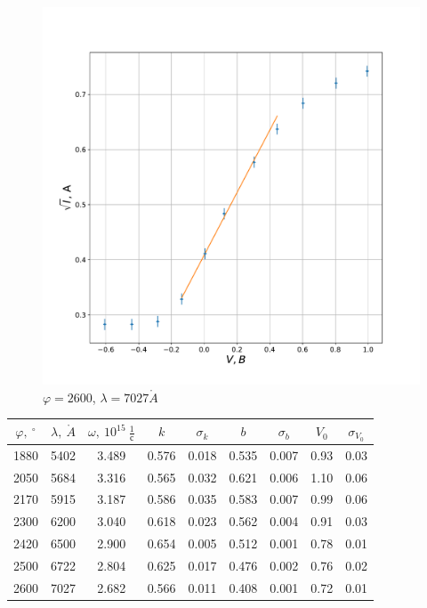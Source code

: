 \documentclass[a4paper, 12pt]{article}
\renewcommand{\phi}{\varphi}
\renewcommand{\AA}{\ensuremath{\mathring{A}}}
\begin{document}
\begin{figure}[H]
    \centering
    \includegraphics[scale=0.5]{2600}
    \caption {$\phi = 2600$, $\lambda = 7027 \AA$}
\end{figure}

\begin{table}[H]
    \centering
    \begin{tabular}{|c|c|c|c|c|c|c|c|c|}
        \hline
        $\phi, ~^\circ$ & $\lambda, ~\AA$ & $\omega, ~10^{15}~\frac{1}{с}$ & $k$ & $\sigma_k$ & $b$ & $\sigma_b$ & $V_0$ & $\sigma_{V_0}$ \\ \hline
        1880 & 5402 & 3.489 & 0.576 & 0.018 & 0.535 & 0.007 & 0.93 & 0.03\\ \hline
        2050 & 5684 & 3.316 & 0.565 & 0.032 & 0.621 & 0.006 & 1.10 & 0.06\\ \hline
        2170 & 5915 & 3.187 & 0.586 & 0.035 & 0.583 & 0.007 & 0.99 & 0.06\\ \hline
        2300 & 6200 & 3.040 & 0.618 & 0.023 & 0.562 & 0.004 & 0.91 & 0.03\\ \hline
        2420 & 6500 & 2.900 & 0.654 & 0.005 & 0.512 & 0.001 & 0.78 & 0.01\\ \hline
        2500 & 6722 & 2.804 & 0.625 & 0.017 & 0.476 & 0.002 & 0.76 & 0.02\\ \hline
        2600 & 7027 & 2.682 & 0.566 & 0.011 & 0.408 & 0.001 & 0.72 & 0.01
        \\ \hline
    \end{tabular}
\end{table}
\end{document}

